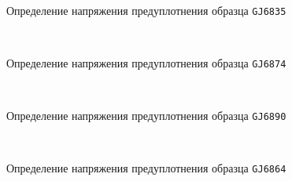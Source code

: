 \begin{figure}[ht]
    {\centering
      \small
      \hfill 
      \\
      \hfill  
      \hfill 
      }
      \caption{Определение напряжения предуплотнения образца \texttt{GJ6835}}
      \label{img:6835}
    \end{figure}
    
    \begin{figure}
        {\centering
        \small
          \hfill 
          \\
          \hfill  
          \hfill 
          }
          \caption{Определение напряжения предуплотнения образца \texttt{GJ6874}}
          \label{img:6874}
    \end{figure}
    
    \begin{figure}
        {\centering
        \small
            \hfill 
            \\
            \hfill  
            \hfill 
            }
            \caption{Определение напряжения предуплотнения образца \texttt{GJ6890}}
            \label{img:6890}
    \end{figure}
    
    
    \begin{figure}
        {\centering
        \small
            \hfill 
            \\
            \hfill  
            \hfill 
            }
            \caption{Определение напряжения предуплотнения образца \texttt{GJ6864}}
            \label{img:6864}
    \end{figure}
    
